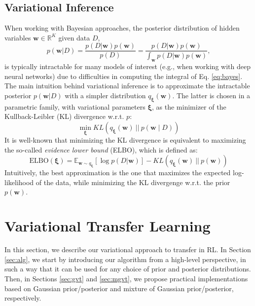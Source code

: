 \documentclass{article}
\begin{document}
\subsection{Variational Inference}

When working with Bayesian approaches, the posterior distribution of hidden variables $\bm{w} \in \mathbb{R}^K$ given data $D$,
\begin{equation}\label{eq:bayes}
p(\bm{w} | D) = \frac{p(D | \bm{w})p(\bm{w})}{p(D)} = \frac{p(D | \bm{w})p(\bm{w})}{\int_{\bm{w}} p(D | \bm{w})p(\bm{w})},
\end{equation}
is typically intractable for many models of interest (e.g., when working with deep neural networks) due to difficulties in computing the integral of Eq. \eqref{eq:bayes}. The main intuition behind variational inference \cite{}  is to approximate the intractable posterior $p(\bm{w} | D)$ with a simpler distribution $q_{\bm{\xi}}(\bm{w})$. The latter is chosen in a parametric family, with variational parameters $\bm{\xi}$, as the minimizer of the Kullback-Leibler (KL) divergence w.r.t. $p$:
\begin{equation}
\min_{\bm{\xi}} KL\left(q_{\bm{\xi}}(\bm{w})\ ||\ p(\bm{w} \mid D)\right)
\end{equation}
It is well-known that minimizing the KL divergence is equivalent to maximizing the so-called \textit{evidence lower bound} (ELBO), which is defined as:
\begin{equation}
\text{ELBO}(\bm{\xi}) = \mathbb{E}_{\bm{w} \sim q_{\bm{\xi}}}\left[ \log p(D | \bm{w}) \right] - KL\left(q_{\bm{\xi}}(\bm{w})\ ||\ p(\bm{w})\right)
\end{equation}
Intuitively, the best approximation is the one that maximizes the expected log-likelihood of the data, while minimizing the KL divergenge w.r.t. the prior $p(\bm{w})$.

\section{Variational Transfer Learning}

In this section, we describe our variational approach to transfer in RL. In Section \ref{sec:alg}, we start by introducing our algorithm from a high-level perspective, in such a way that it can be used for any choice of prior and posterior distributions. Then, in Sections \ref{sec:gvt} and \ref{sec:mgvt}, we propose practical implementations based on Gaussian prior/posterior and mixture of Gaussian prior/posterior, respectively.
\end{document}
